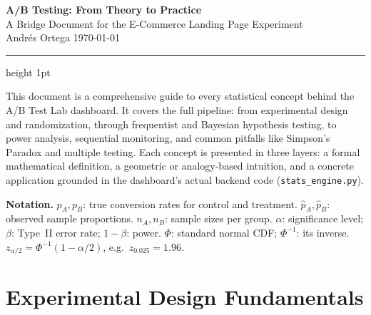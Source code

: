 \documentclass[11pt,a4paper]{article}
\newcommand{\code}[1]{\texttt{#1}}
\begin{document}
\begin{center}
  {\LARGE\bfseries\color{darkred} A/B Testing: From Theory to Practice}\\[6pt]
  {\large\color{royalblue} A Bridge Document for the E-Commerce Landing Page Experiment}\\[8pt]
  {\small Andr\'{e}s Ortega \quad\textbullet\quad \today}
\end{center}
\vspace{4pt}
{\color{royalblue}\hrule height 1pt}
\vspace{10pt}

\begin{tcolorbox}[
  enhanced,
  colback=white,
  colframe=royalblue,
  boxrule=0.8pt,
  sharp corners,
  title={\bfseries\color{royalblue} Abstract},
  fonttitle=\bfseries,
  top=4pt, bottom=4pt
]
This document is a comprehensive guide to every statistical concept behind the A/B Test Lab dashboard.
It covers the full pipeline: from experimental design and randomization, through frequentist and Bayesian hypothesis testing,
to power analysis, sequential monitoring, and common pitfalls like Simpson's Paradox and multiple testing.
Each concept is presented in three layers: a formal mathematical definition, a geometric or analogy-based intuition,
and a concrete application grounded in the dashboard's actual backend code (\code{stats\_engine.py}).

\medskip
\textbf{Notation.}
$p_A, p_B$: true conversion rates for {\color{controlblue}control} and {\color{treatmentgreen}treatment}.
$\hat{p}_A, \hat{p}_B$: observed sample proportions.
$n_A, n_B$: sample sizes per group.
$\alpha$: significance level; $\beta$: Type~II error rate; $1-\beta$: power.
$\Phi$: standard normal CDF; $\Phi^{-1}$: its inverse.
$z_{\alpha/2} = \Phi^{-1}(1-\alpha/2)$, e.g.\ $z_{0.025} = 1.96$.
\end{tcolorbox}
\vspace{8pt}
\tableofcontents
\newpage

\section{Experimental Design Fundamentals}
\end{document}
